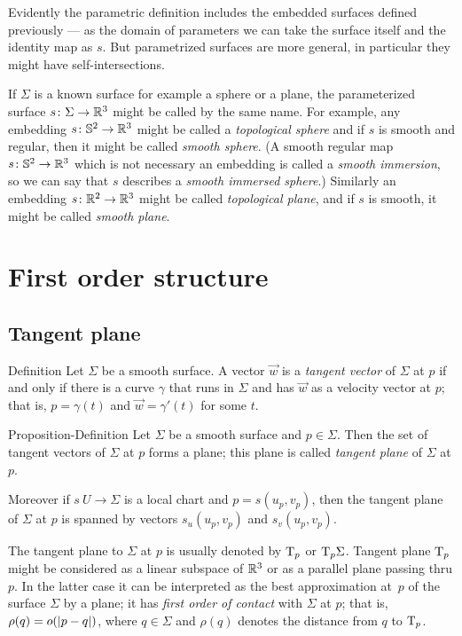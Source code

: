 Evidently the parametric definition includes the embedded surfaces defined previously --- as the domain of parameters we can take the surface itself and the identity map as $s$.
But parametrized surfaces are more general, in particular they  might  have self-intersections.

If $\Sigma$ is a known surface for example a sphere or a plane, the parameterized surface $s\colon\Sigma\to\mathbb{R}^3$ might be called by the same name.
For example, any embedding $s\colon\mathbb{S}^2\to\mathbb{R}^3$ might be called a \emph{topological sphere}
and if $s$ is smooth and regular, then it might be called \emph{smooth sphere}.
(A smooth regular map $s\colon\mathbb{S}^2\to\mathbb{R}^3$ which is not necessary an embedding is called a \emph{smooth immersion}, so we can say that $s$ describes a \emph{smooth immersed sphere}.) 
Similarly an embedding $s\colon\mathbb{R}^2\to\mathbb{R}^3$ might be called \emph{topological plane},
and if $s$ is smooth, it might be called \emph{smooth plane}.

\chapter{First order structure}

\section{Tangent plane}

\begin{thm}{Definition}\label{def:tangent-vector}
Let $\Sigma$ be a smooth surface.
A vector $\vec w$ is a \emph{tangent vector} of $\Sigma$ at $p$ if and only if there is a curve $\gamma$ that runs in $\Sigma$ and has $\vec w$ as a velocity vector at $p$;
that is, $p=\gamma(t)$ and $\vec w=\gamma'(t)$ for some $t$.
\end{thm}

\begin{thm}{Proposition-Definition}\label{def:tangent-plane}
Let $\Sigma$ be a smooth surface and $p\in \Sigma$.
Then the set of tangent vectors of $\Sigma$ at $p$ forms a plane;
this plane is called \emph{tangent plane} of $\Sigma$ at $p$.

Moreover if $s\:U\to \Sigma$ is a local chart and $p=s(u_p,v_p)$, then 
the tangent plane of $\Sigma$ at $p$ is spanned by vectors $s_u(u_p,v_p)$ and $s_v(u_p,v_p)$.
\end{thm}

The tangent plane to $\Sigma$ at $p$ is usually denoted by $\mathrm{T}_p$ or $\mathrm{T}_p\Sigma$.
Tangent plane $\mathrm{T}_p$ might be considered as a linear subspace of $\mathbb{R}^3$ or as a parallel plane passing thru $p$.
In the latter case it can be interpreted as the best approximation at~$p$ of the surface $\Sigma$ by a plane;
it has \emph{first order of contact} with $\Sigma$ at $p$;
that is, $\rho(q)\z=o(|p-q|)$, where $q\in \Sigma$ and $\rho(q)$ denotes the distance from $q$ to $\mathrm{T}_p$.

